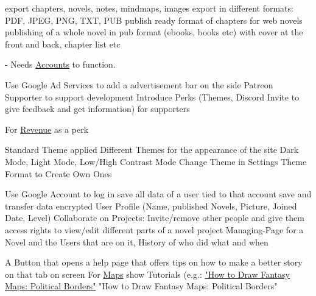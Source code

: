 \begin{outline}
    \1 export chapters, novels, notes, mindmaps, images
    \1 export in different formats: PDF, JPEG, PNG, TXT, PUB
    \1 publish ready format of chapters for web novels
    \1 publishing of a whole novel in pub format (ebooks, books etc) with cover at the front and back, chapter list etc
\end{outline}
-
Needs \hyperref[fnc:accounts]{Accounts} to function.
\begin{outline}
    \1 Use Google Ad Services to add a advertisement bar on the side
    \1 Patreon Supporter to support development 
    \1 Introduce Perks (Themes, Discord Invite to give feedback and get information) for supporters
\end{outline}

For \hyperref[fnc:revenue]{Revenue} as a perk 
\begin{outline}
    \1 Standard Theme applied
    \1 Different Themes for the appearance of the site
    \1 Dark Mode, Light Mode, Low/High Contrast Mode
    \1 Change Theme in Settings
    \1 Theme Format to Create Own Ones
\end{outline}

\begin{outline}
    \1 Use Google Account to log in
    \1 save all data of a user tied to that account
    \1 save and transfer data encrypted
    \1 User Profile (Name, published Novels, Picture, Joined Date, Level)
    \1 Collaborate on Projects: Invite/remove other people and give them access rights to view/edit different parts of a novel project
    \1 Managing-Page for a Novel and the Users that are on it, History of who did what and when
\end{outline}

\begin{outline}
    \1 A Button that opens a help page that offers tips on how to make a better story on that tab on screen
      \2 For \hyperref[fnc:map]{Maps} show Tutorials (e.g.: \href{https://www.youtube.com/watch?v=XpkVzsoAfog}{"How to Draw Fantasy Maps: Political Borders"} "How to Draw Fantasy Maps: Political Borders"
      \2 
\end{outline}